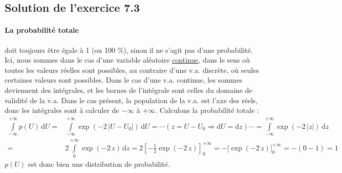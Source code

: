 \subsection*{Solution de l'exercice 7.3}

\paragraph{La probabilité totale} doit toujours être égale à 1 (ou 100 \%), sinon il ne s'agit pas d'une probabilité. Ici, nous sommes dans le cas d'une variable aléatoire \underline{continue}, dans le sens où toutes les valeurs réelles sont possibles, au contraire d'une v.a. discrète, où seules certaines valeurs sont possibles. Dans le cas d'une v.a. continue, les sommes deviennent des intégrales, et les bornes de l'intégrale sont celles du domaine de validité de la v.a. Dans le cas présent, la population de la v.a. est l'axe des réels, donc les intégrales sont à calculer de $-\infty$ à $+\infty$. Calculons la probabilité totale :
\begin{align*}
\int\limits_{-\infty}^{+\infty} p(U)\,\text{d}U=&
\int\limits_{-\infty}^{+\infty}\exp{(-2\,|U-U_0|)}\,\text{d}U=\cdots (z=U-U_0\Rightarrow\text{d}U=\text{d}z)\cdots
=\int\limits_{-\infty}^{+\infty}\exp{(-2\,|z|)}\,\text{d}z\\
=&2\int\limits_{0}^{+\infty}\exp{(-2\,z)}\,\text{d}z=2\left[-\frac{1}{2}\exp{(-2\,z)}\right]_{0}^{+\infty}=
-\Big[\exp{(-2\,z)}\Big]_{0}^{+\infty}=-(0-1)=1
\end{align*}
$p(U)$ est donc bien une distribution de probabilité.

